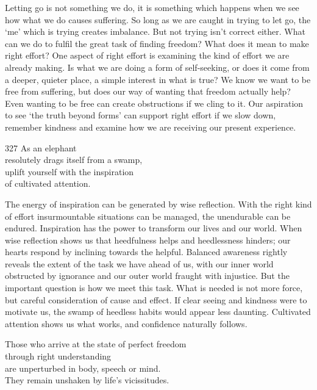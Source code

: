 \begin{dhpRefl}
  Letting go is not something we do, it is something which happens when we see
  how what we do causes suffering. So long as we are caught in trying to let go,
  the `me' which is trying creates imbalance. But not trying isn’t correct
  either. What can we do to fulfil the great task of finding freedom? What does
  it mean to make right effort? One aspect of right effort is examining the kind
  of effort we are already making. Is what we are doing a form of self-seeking,
  or does it come from a deeper, quieter place, a simple interest in what is
  true? We know we want to be free from suffering, but does our way of wanting
  that freedom actually help? Even wanting to be free can create obstructions if
  we cling to it. Our aspiration to see ‘the truth beyond forms’ can support
  right effort if we slow down, remember kindness and examine how we are
  receiving our present experience.
\end{dhpRefl}


\begin{dhpVerse}{327}
\label{dhp-327}
As an elephant\\
resolutely drags itself from a swamp,\\
uplift yourself with the inspiration\\
of cultivated attention.
\end{dhpVerse}

\begin{dhpRefl}
  The energy of inspiration can be generated by wise reflection. With the right
  kind of effort insurmountable situations can be managed, the unendurable can
  be endured. Inspiration has the power to transform our lives and our world.
  When wise reflection shows us that heedfulness helps and heedlessness hinders;
  our hearts respond by inclining towards the helpful. Balanced awareness
  rightly reveals the extent of the task we have ahead of us, with our inner
  world obstructed by ignorance and our outer world fraught with injustice. But
  the important question is how we meet this task. What is needed is not more
  force, but careful consideration of cause and effect. If clear seeing and
  kindness were to motivate us, the swamp of heedless habits would appear less
  daunting. Cultivated attention shows us what works, and confidence naturally
  follows.
\end{dhpRefl}


\begin{dhpVerse}{96}
\label{dhp-96}
Those who arrive at the state of perfect freedom\\
through right understanding\\
are unperturbed in body, speech or mind.\\
They remain unshaken by life's vicissitudes.
\end{dhpVerse}

